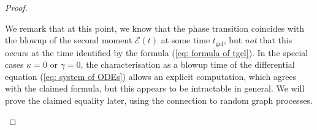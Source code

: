 \begin{proof}
\begin{remark} We remark that at this point, we know that the phase transition coincides with the blowup of the second moment $\mathcal{E}(t)$ at some time $t_\mathrm{gel}$, but \emph{not} that this occurs at the time identified by the formula (\ref{eq: formula of tgel}). In the special cases $\kappa=0$ or $\gamma=0$, the characterisation as a blowup time of the differential equation (\ref{eq: system of ODEs}) allows an explicit computation, which agrees with the claimed formula, but this appears to be intractable in general. We will prove the claimed equality later, using the connection to random graph processes. \end{remark}


\iffalse We define the map \begin{equation}
    f(t) := \langle \pi_n^2, \mu_t\rangle
           + \sqrt{\frac{\langle \pi_n^2, \mu_0\rangle}
                        {\langle \pi_e^2, \mu_0\rangle}}
             \langle \pi_n \pi_e, \mu_t\rangle.
\end{equation} Then $f$ is finite on $[0, T)$, and so we find the differential equation on $[0,T)$ \begin{equation}
    \frac{d}{dt}f(t)=4\gamma\sqrt{\frac{\langle \pi_e^2, \mu_t\rangle}{\langle \pi_n^2, \mu_0\rangle}}f(t)^2
\end{equation} has a finite solution on $[0,T)$. By the previous calculation, $f$ blows up precisely at $t_\mathrm{gel}$, and so $T\leq t_\mathrm{gel}.$ On the other hand, we observe that there is some $C(\mu_0)$ such that, for all times $t<T$, \begin{equation}
    \langle (\pi_n+\pi_e)^2, \mu_t \rangle \leq Cf(t).
\end{equation} Therefore, if we assume that $T<t_\mathrm{gel}$, we would conclude that $\sup_{t<T} \langle (\pi_n+\pi_e)^2, \mu_t\rangle <\infty$, which is a contradiction. Hence, $T=t_\mathrm{gel}$, which proves the claimed result. \fi \end{proof} 
